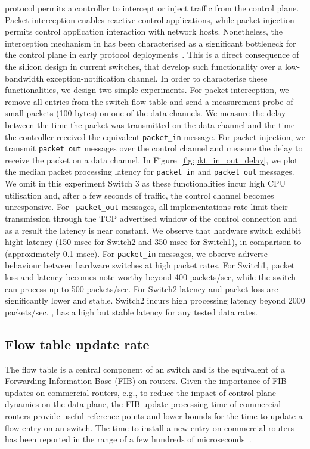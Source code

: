 \of protocol permits a controller to intercept or inject traffic from the
control plane. Packet interception enables reactive control applications, while
packet injection permits control application interaction with network hosts.
Nonetheless, the interception mechanism in \of has been characterised as a
significant bottleneck for the control plane in early \of protocol
deployments~\cite{Kobayashi:vn}. This is a direct consequence of the silicon
design in current \of switches, that develop such functionality over a
low-bandwidth exception-notification channel. In order to characterise these
functionalities, we design two simple experiments. For packet interception, we
remove all entries from the switch flow table and send a measurement probe of
small packets (100 bytes) on one of the data channels. We measure the delay
between the time the packet was transmitted on the data channel and the time the
controller received the equivalent {\tt packet\_in} message. For packet
injection, we transmit {\tt packet\_out} messages over the control channel and
measure the delay to receive the packet on a data channel. In
Figure~\ref{fig:pkt_in_out_delay}, we plot the median packet processing latency
for {\tt packet\_in} and {\tt packet\_out} messages. We omit in this experiment
Switch 3 as these functionalities incur high CPU utilisation and, after a few
seconds of traffic, the control channel becomes unresponsive. For {\tt
  packet\_out} messages, all implementations rate limit their transmission
through the TCP advertised window of the control connection and as a result the
latency is near constant. We observe that hardware switch exhibit hight latency
(150 msec for Switch2 and 350 msec for Switch1), in comparison to \ovs
(approximately 0.1 msec).  For {\tt packet\_in} messages, we observe adiverse
behaviour between hardware switches at high packet rates. For Switch1, packet
loss and latency becomes note-worthy beyond 400 packets/sec, while the switch
can process up to 500 packets/sec. For Switch2 latency and packet loss are
significantly lower and stable. Switch2 incurs high processing latency beyond
2000 packets/sec.  \ovs, has a high but stable latency for any tested
data rates. 

\subsection{Flow table update rate}\label{sec:results-rate}

The flow table is a central component of an \of switch and is the
equivalent of a Forwarding Information Base (FIB) on routers. Given the
importance of FIB updates on commercial routers, e.g., to reduce the impact of
control plane dynamics on the data plane, the FIB update processing time of
commercial routers provide useful reference points and lower bounds for the time
to update a flow entry on an \of switch. The time to install a new entry on
commercial routers has been reported in the range of a few hundreds of
microseconds~\cite{shaikh-igp}.

